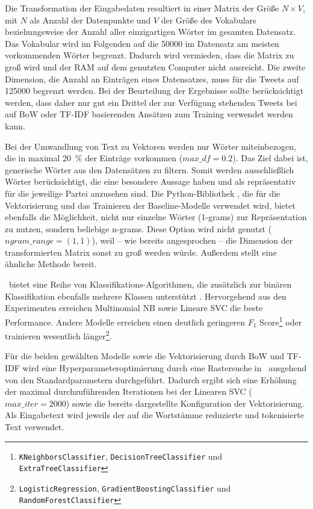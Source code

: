 Die Transformation der Eingabedaten resultiert in einer Matrix der Größe \(N \times V\), mit \(N\) als Anzahl der Datenpunkte und \(V\) der Größe des Vokabulars beziehungsweise der Anzahl aller einzigartigen Wörter im gesamten Datensatz. Das Vokabular wird im Folgenden auf die \num{50000} im Datensatz am meisten vorkommenden Wörter begrenzt. Dadurch wird vermieden, dass die Matrix zu groß wird und der \ac{RAM} auf dem genutzten Computer nicht ausreicht. Die zweite Dimension, die Anzahl an Einträgen eines Datensatzes, muss für die Tweets auf \num{125000} begrenzt werden. Bei der Beurteilung der Ergebnisse sollte berücksichtigt werden, dass daher nur gut ein Drittel der zur Verfügung stehenden Tweets bei auf \ac{BoW} oder \ac{TF-IDF} basierenden Ansätzen zum Training verwendet werden kann.

Bei der Umwandlung von Text zu Vektoren werden nur Wörter miteinbezogen, die in maximal \SI{20}{\percent} der Einträge vorkommen (\(max\_df = \num{0.2}\)). Das Ziel dabei ist, generische Wörter aus den Datensätzen zu filtern. Somit werden ausschließlich Wörter berücksichtigt, die eine besondere Aussage haben und als repräsentativ für die jeweilige Partei anzusehen sind. Die Python-Bibliothek \sk, die für die Vektorisierung und das Trainieren der Baseline-Modelle verwendet wird, bietet ebenfalls die Möglichkeit, nicht nur einzelne Wörter (1-grams) zur Repräsentation zu nutzen, sondern beliebige n-grams. Diese Option wird nicht genutzt (\(ngram\_range = (\num{1}, \num{1})\)), weil -- wie bereits angesprochen -- die Dimension der transformierten Matrix sonst zu groß werden würde. Außerdem stellt \ft eine ähnliche Methode bereit.

\sk~bietet eine Reihe von Klassifikations-Algorithmen, die zusätzlich zur binären Klassifikation ebenfalls mehrere Klassen unterstützt \autocite{noauthor_112_nodate}. Hervorgehend aus den Experimenten erreichen Multinomial \ac{NB} sowie Lineare \ac{SVC} die beste Performance. Andere Modelle erreichen einen deutlich geringeren \(F_1\) Score\footnote{\texttt{KNeighborsClassifier}, \texttt{DecisionTreeClassifier} und \texttt{ExtraTreeClassifier}} oder trainieren wesentlich länger\footnote{\texttt{LogisticRegression}, \texttt{GradientBoostingClassifier} und \texttt{RandomForestClassifier}}.

Für die beiden gewählten Modelle sowie die Vektorisierung durch \ac{BoW} und \ac{TF-IDF} wird eine Hyperparameteroptimierung durch eine Rastersuche in \sk~ausgehend von den Standardparametern durchgeführt. Dadurch ergibt sich eine Erhöhung der maximal durchzuführenden Iterationen bei der Linearen \ac{SVC} (\(max\_iter = \num{2000}\)) sowie die bereits dargestellte Konfiguration der Vektorisierung. Als Eingabetext wird jeweils der auf die Wortstämme reduzierte und tokenisierte Text verwendet.
    
